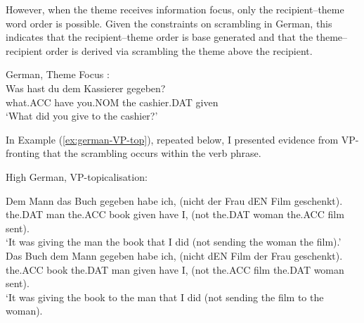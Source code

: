 However, when the theme receives information focus, only the recipient--theme word order is possible. Given the constraints on scrambling in German, this indicates that the recipient--theme order is base generated and that the theme--recipient order is derived via scrambling the theme above the recipient.

\begin{exe}
	\ex German, Theme Focus \citep{Choi.1996}:\\
	\gll Was hast du dem Kassierer gegeben?\\
what.ACC have you.NOM the cashier.DAT given\\
\trans `What did you give to the cashier?'

\begin{xlist}

\end{xlist}
\end{exe}

In Example (\ref{ex:german-VP-top}), repeated below, I presented evidence from VP-fronting that the scrambling occurs within the verb phrase. 

	\begin{exe}
		 High German, VP-topicalisation:
		\begin{xlist}
			\ex \gll  Dem Mann das Buch gegeben habe ich, (nicht der Frau dEN Film geschenkt).\\
			the.DAT man the.ACC book given have I, (not the.DAT woman the.ACC film sent).\\
			\trans `It was giving the man the book that I did (not sending the woman the film).'
			\ex \gll Das Buch dem Mann gegeben habe ich, (nicht dEN Film der Frau geschenkt).\\
			the.ACC book the.DAT man given have I, (not the.ACC film the.DAT woman sent).\\
			\trans `It was giving the book to the man that I did (not sending the film to the woman).\\
		\end{xlist}
	\end{exe}

